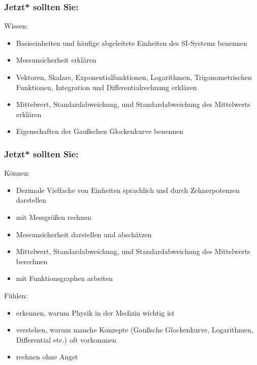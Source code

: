 \documentclass{beamer}
\begin{document}
\begin{frame}

\frametitle{Jetzt* sollten Sie:}



\begin{block}{Wissen:}
\begin{itemize}
\item
Basiseinheiten und häufige abgeleitete Einheiten des SI-Systems benennen
\item
Messunsicherheit erklären
\item
 Vektoren, Skalare, Exponentialfunktionen, Logarithmen, Trigonometrischen Funktionen, Integration und Differentialrechnung erklären
\item 
Mittelwert, Standardabweichung, und Standardabweichung des Mittelwerts erklären 
\item
Eigenschaften der Gaußschen Glockenkurve benennen
\end{itemize}
\end{block}

\end{frame}

\begin{frame}

\frametitle{Jetzt* sollten Sie:}
 



\begin{block}{Können:}
\begin{itemize}
\item
 Dezimale Vielfache von Einheiten sprachlich und durch Zehnerpotenzen darstellen
\item
 mit Messgrößen rechnen
\item
 Messunsicherheit darstellen und abschätzen
\item
 Mittelwert, Standardabweichung, und Standardabweichung des Mittelwerts berechnen
\item 
mit Funktionsgraphen arbeiten
\end{itemize}
\end{block}

 
\begin{block}{Fühlen:}
\begin{itemize}
\item
erkennen, warum Physik in der Medizin wichtig ist
\item
verstehen, warum manche Konzepte (Gaußsche Glockenkurve, Logarithmen, Differential etc.) oft vorkommen
\item
 rechnen ohne Angst
\end{itemize}
\end{block}

\end{frame}
\end{document}
